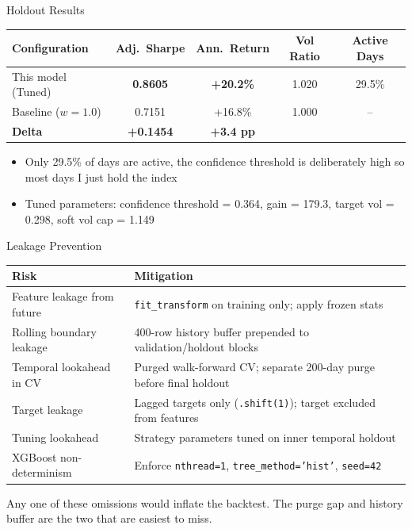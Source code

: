 \documentclass[aspectratio=169]{beamer}
\begin{document}
\begin{frame}{Holdout Results}
\begin{center}
\small
\begin{tabular}{lcccc}
\toprule
\textbf{Configuration} & \textbf{Adj.\ Sharpe} & \textbf{Ann.\ Return} & \textbf{Vol Ratio} & \textbf{Active Days} \\
\midrule
This model (Tuned) & \textbf{0.8605} & \textbf{+20.2\%} & 1.020 & 29.5\% \\
Baseline ($w=1.0$) & 0.7151          & +16.8\%          & 1.000 & --    \\
\midrule
\textbf{Delta}     & \textbf{+0.1454} & \textbf{+3.4 pp} &       &        \\
\bottomrule
\end{tabular}
\end{center}
\vspace{0.25cm}
\begin{itemize}
    \item Only 29.5\% of days are active, the confidence threshold is deliberately high so most days I just hold the index
    \item Tuned parameters: confidence threshold = 0.364, gain = 179.3, target vol = 0.298, soft vol cap = 1.149
\end{itemize}
\end{frame}

\begin{frame}{Leakage Prevention}
\begin{table}
\footnotesize
\begin{tabular}{p{4.8cm}p{7.2cm}}
\toprule
\textbf{Risk} & \textbf{Mitigation} \\
\midrule
Feature leakage from future & \texttt{fit\_transform} on training only; apply frozen stats \\
Rolling boundary leakage & 400-row history buffer prepended to validation/holdout blocks \\
Temporal lookahead in CV & Purged walk-forward CV; separate 200-day purge before final holdout \\
Target leakage & Lagged targets only (\texttt{.shift(1)}); target excluded from features \\
Tuning lookahead & Strategy parameters tuned on inner temporal holdout \\
XGBoost non-determinism & Enforce \texttt{nthread=1}, \texttt{tree\_method='hist'}, \texttt{seed=42} \\
\bottomrule
\end{tabular}
\end{table}
\vspace{0.2cm}
Any one of these omissions would inflate the backtest. The purge gap and history buffer are the two that are easiest to miss.
\end{frame}
\end{document}

